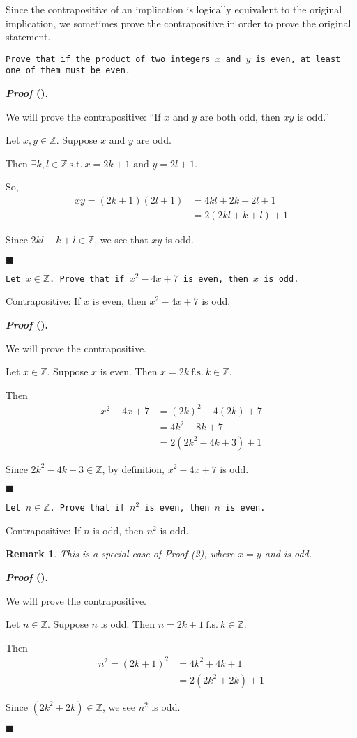 \documentclass[12pt,a4paper]{article}
\newcounter{nprf}[subsection]
\newtheorem*{rmk}{\indent Remark}
\newenvironment*{prf}{\par\indent\textbf{\textit{Proof} (\stepcounter{nprf}\thenprf). }\par}{\par\hfill $\blacksquare$\par}
\def\Z{{\mathbb{Z}}}
\def\st{\ \mathrm{s.t.}\ }
\def\fs{\ \mathrm{f.s.}\ }
\begin{document}
Since the contrapositive of an implication is logically equivalent to the original implication, we sometimes prove the contrapositive in order to prove the original statement. 
\begin{framed}
\noindent\texttt{Prove that if the product of two integers $x$ and $y$ is even, at least one of them must be even.}
\begin{prf}
	We will prove the contrapositive: ``If $x$ and $y$ are both odd, then $xy$ is odd.''\par Let $x,y\in\Z$. Suppose $x$ and $y$ are odd.\par Then $\exists k,l\in\Z\st x=2k+1\text{ and }y=2l+1.$\par So, \[\begin{aligned}
		xy=(2k+1)(2l+1)&=4kl+2k+2l+1\\&=2(2kl+k+l)+1
	\end{aligned}\]\par Since $2kl+k+l\in\Z$, we see that $xy$ is odd.
\end{prf}	
\end{framed}
\begin{framed}
\noindent\texttt{Let $x\in\Z$. Prove that if $x^2-4x+7$ is even, then $x$ is odd. }\par
Contrapositive: If $x$ is even, then $x^2-4x+7$ is odd.
\begin{prf}
	We will prove the contrapositive.\par Let $x\in\Z$. Suppose $x$ is even. Then $x=2k\fs k\in\Z$.\par Then \[\begin{aligned}
		x^2-4x+7&=(2k)^2-4(2k)+7\\&=4k^2-8k+7\\&=2(2k^2-4k+3)+1
	\end{aligned}\]\par Since $2k^2-4k+3\in\Z$, by definition, $x^2-4x+7$ is odd. 
\end{prf}
\end{framed}
\begin{framed}
\noindent\texttt{Let $n\in\Z$. Prove that if $n^2$ is even, then $n$ is even.}\par 
Contrapositive: If $n$ is odd, then $n^2$ is odd. 
\begin{rmk}	This is a special case of Proof (2), where $x=y$ and is odd.\end{rmk}
\begin{prf}
	We will prove the contrapositive.\par Let $n\in\Z$. Suppose $n$ is odd. Then $n=2k+1\fs k\in\Z.$\par Then \[\begin{aligned}
		n^2=(2k+1)^2&=4k^2+4k+1\\&=2(2k^2+2k)+1
	\end{aligned}\]\par Since $(2k^2+2k)\in\Z$, we see $n^2$ is odd. 
\end{prf}
\end{framed}
\end{document}
